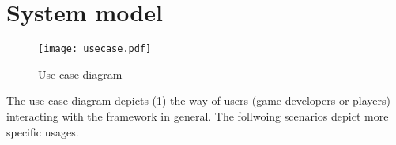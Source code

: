 \section{System model}

\begin{figure}[h]
	\centering
	\texttt{[image: usecase.pdf]}
	\caption{Use case diagram}
	\label{img:UCD}
\end{figure}

The use case diagram depicts (\ref{img:UCD}) the  way of users (game developers or players) interacting with the framework in general. The follwoing scenarios depict more specific usages.